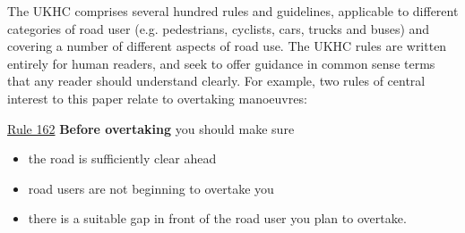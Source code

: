 The UKHC comprises several hundred rules and guidelines, applicable to different categories of road user 
(e.g. pedestrians, cyclists, cars, trucks and buses) 
and covering a number of different aspects of road use. 
The UKHC rules are written entirely for human readers, and seek to offer guidance in common sense terms that any reader should understand clearly. For example, two rules of central interest to this paper relate to overtaking manoeuvres:

\vspace{2mm}
\noindent\underline{Rule 162}    
    \textbf{Before overtaking} you should make sure
    \begin{itemize}
        \item the road is sufficiently clear ahead
        \item road users are not beginning to overtake you
        \item there is a suitable gap in front of the road user you plan to overtake.
    \end{itemize}
	
    
